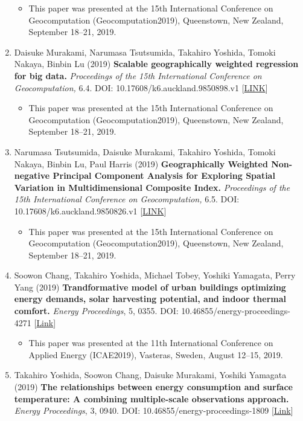 \documentclass[
]{book}
\providecommand{\tightlist}{%
  \setlength{\itemsep}{0pt}\setlength{\parskip}{0pt}}
\begin{document}
\begin{enumerate}
  \begin{itemize}
  \tightlist
  \item
    This paper was presented at the 15th International Conference on Geocomputation (Geocomputation2019), Queenstown, New Zealand, September 18--21, 2019.
  \end{itemize}
\item
  Daisuke Murakami, Narumasa Tsutsumida, Takahiro Yoshida, Tomoki Nakaya, Binbin Lu (2019)
  \textbf{Scalable geographically weighted regression for big data.}
  \emph{Proceedings of the 15th International Conference on Geocomputation,} 6.4.
  DOI: 10.17608/k6.auckland.9850898.v1 {[}\href{https://doi.org/10.17608/k6.auckland.9850898.v1}{LINK}{]}

  \begin{itemize}
  \tightlist
  \item
    This paper was presented at the 15th International Conference on Geocomputation (Geocomputation2019), Queenstown, New Zealand, September 18--21, 2019.
  \end{itemize}
\item
  Narumasa Tsutsumida, Daisuke Murakami, Takahiro Yoshida, Tomoki Nakaya, Binbin Lu, Paul Harris (2019)
  \textbf{Geographically Weighted Non-negative Principal Component Analysis for Exploring Spatial Variation in Multidimensional Composite Index.}
  \emph{Proceedings of the 15th International Conference on Geocomputation,} 6.5.
  DOI: 10.17608/k6.auckland.9850826.v1 {[}\href{https://doi.org/10.17608/k6.auckland.9850826.v1}{LINK}{]}

  \begin{itemize}
  \tightlist
  \item
    This paper was presented at the 15th International Conference on Geocomputation (Geocomputation2019), Queenstown, New Zealand, September 18--21, 2019.
  \end{itemize}
\item
  Soowon Chang, Takahiro Yoshida, Michael Tobey, Yoshiki Yamagata, Perry Yang (2019)
  \textbf{Trandformative model of urban buildings optimizing energy demands, solar harvesting potential, and indoor thermal comfort.}
  \emph{Energy Proceedings}, 5, 0355.
  DOI: 10.46855/energy-proceedings-4271 {[}\href{https://doi.org/10.46855/energy-proceedings-4271}{Link}{]}

  \begin{itemize}
  \tightlist
  \item
    This paper was presented at the 11th International Conference on Applied Energy (ICAE2019), Vasteras, Sweden, August 12--15, 2019.
  \end{itemize}
\item
  Takahiro Yoshida, Soowon Chang, Daisuke Murakami, Yoshiki Yamagata (2019)
  \textbf{The relationships between energy consumption and surface temperature: A combining multiple-scale observations approach.}
  \emph{Energy Proceedings}, 3, 0940.
  DOI: 10.46855/energy-proceedings-1809 {[}\href{https://doi.org/10.46855/energy-proceedings-1809}{Link}{]}


\end{enumerate}
\end{document}
